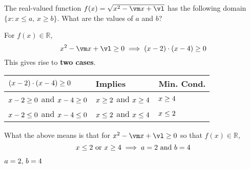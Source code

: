 

\ADD\va\vb\vm
\MULTIPLY\va\vb\vl

\question[3] The real-valued function $f(x) = \sqrt{x^2-\vm x+\vl}$ has
the following domain $\{x : x \leq a,\, x \geq b\}$. What are the 
values of $a$ and $b$?

\watchout

\begin{solution}[\halfpage]
  For $f(x)\in\mathbb{R}$,
  \[ x^2-\vm x + \vl \geq 0 \implies (x-\va)\cdot (x-\vb) \geq 0\] 
  This gives rise to \textbf{two cases}.

  \begin{tabular}{l l l}
    \toprule
      $(x-2)\cdot(x-4)\geq 0$ & Implies & Min. Cond. \\ 
    \midrule
     $x-2 \geq 0$ and $x-4\geq 0$ & $x\geq2$ and $x\geq 4$ & $x\geq4$\\
     $x-2 \leq 0$ and $x-4\leq 0$ & $x\leq2$ and $x\leq 4$ & $x\leq2$ \\
    \bottomrule
  \end{tabular} 
  
  What the above means is that for $x^2-\vm x + \vl\geq 0$ so that  $f(x)\in\mathbb{R}$, 
  \[ x \leq 2 \text{ or } x\geq 4 \implies a= 2\text{ and } b = 4 \] 
\end{solution}
\ifprintanswers\begin{codex}$a=2,\, b = 4$\end{codex}\fi
